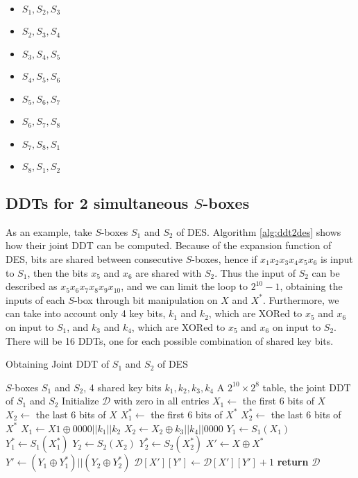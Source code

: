 \documentclass{report}
\begin{document}
\begin{itemize}
    \item $S_1, S_2, S_3$
    \item $S_2, S_3, S_4$
    \item $S_3, S_4, S_5$
    \item $S_4, S_5, S_6$
    \item $S_5, S_6, S_7$
    \item $S_6, S_7, S_8$
    \item $S_7, S_8, S_1$
    \item $S_8, S_1, S_2$
\end{itemize}

\subsection{DDTs for 2 simultaneous $S$-boxes}

As an example, take $S$-boxes $S_1$ and $S_2$ of DES. Algorithm \ref{alg:ddt2des} shows how their joint DDT can be computed. Because of the expansion function of DES, bits are shared between consecutive $S$-boxes, hence if $x_1x_2x_3x_4x_5x_6$ is input to $S_1$, then the bits $x_5$ and $x_6$ are shared with $S_2$. Thus the input of $S_2$ can be described as $x_5x_6x_7x_8x_9x_{10}$, and we can limit the loop to $2^{10}-1$, obtaining the inputs of each $S$-box through bit manipulation on $X$ and $X^*$. Furthermore, we can take into account only 4 key bits, $k_1$ and $k_2$, which are XORed to $x_5$ and $x_6$ on input to $S_1$, and $k_3$ and $k_4$, which are XORed to $x_5$ and $x_6$ on input to $S_2$. There will be 16 DDTs, one for each possible combination of shared key bits.

\begin{algorithm}[H]
\label{alg:ddt2des}
\caption{Obtaining Joint DDT of $S_1$ and $S_2$ of DES}
\begin{algorithmic}[1]
    \Require $S$-boxes $S_1$ and $S_2$, 4 shared key bits $k_1, k_2, k_3, k_4$  
    \Ensure A $2^{10} \times 2^8$ table, the joint DDT of $S_1$ and $S_2$
    \State Initialize $\mathcal{D}$ with zero in all entries
            \State $X_1 \gets $ the first 6 bits of $X$
            \State $X_2 \gets $ the last 6 bits of $X$
            \State $X_1^* \gets $ the first 6 bits of $X^*$
            \State $X_2^* \gets $ the last 6 bits of $X^*$
            \State $X_1 \gets X1 \oplus 0000||k_1||k_2$
            \State $X_2 \gets X_2 \oplus k_3||k_4||0000$
            \State $Y_1 \gets S_1(X_1)$
            \State $Y_1^* \gets S_1(X_1^*)$
            \State $Y_2 \gets S_2(X_2)$
            \State $Y_2^* \gets S_2(X_2^*)$
            \State $X' \gets X \oplus X^*$
            \State $Y' \gets (Y_1 \oplus Y_1^*) || (Y_2 \oplus Y_2^*)$
            \State $\mathcal{D}[X'][Y'] \gets \mathcal{D}[X'][Y'] + 1$
        \EndFor
    \EndFor
\State \textbf{return} $\mathcal{D}$
\end{algorithmic}
\end{algorithm}
\end{document}
